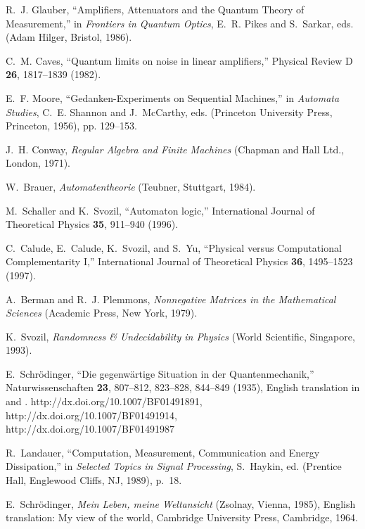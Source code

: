 \documentclass[pra,amsfonts,twocolumn]{revtex4}
\begin{document}
\begin{thebibliography}{10}
R.~J. Glauber, \enquote{Amplifiers, Attenuators and the Quantum Theory of
  Measurement,} in {\em Frontiers in Quantum Optics\/}, E.~R. Pikes and
  S.~Sarkar, eds.  (Adam Hilger, Bristol, 1986).

C.~M. Caves, \enquote{Quantum limits on noise in linear amplifiers,} Physical
  Review D {\bf 26}, 1817--1839 (1982).

E.~F. Moore, \enquote{Gedanken-Experiments on Sequential Machines,} in {\em
  Automata Studies\/}, C.~E. Shannon and J.~McCarthy, eds.  (Princeton
  University Press, Princeton, 1956), pp. 129--153.

J.~H. Conway, {\em Regular Algebra and Finite Machines\/} (Chapman and Hall
  Ltd., London, 1971).

W.~Brauer, {\em Automatentheorie\/} (Teubner, Stuttgart, 1984).

M.~Schaller and K.~Svozil, \enquote{Automaton logic,} International Journal of
  Theoretical Physics {\bf 35}, 911--940 (1996).

C.~Calude, E.~Calude, K.~Svozil, and S.~Yu, \enquote{Physical versus
  Computational Complementarity {I},} International Journal of Theoretical
  Physics {\bf 36}, 1495--1523 (1997).

A.~Berman and R.~J. Plemmons, {\em Nonnegative Matrices in the Mathematical
  Sciences\/} (Academic Press, New York, 1979).

K.~Svozil, {\em Randomness \& Undecidability in Physics\/} (World Scientific,
  Singapore, 1993).

E.~Schr{\"{o}}dinger, \enquote{Die gegenw{\"{a}}rtige {S}ituation in der
  {Q}uantenmechanik,} Naturwissenschaften {\bf 23}, 807--812, 823--828,
  844--849 (1935), {E}nglish translation in \cite{trimmer} and \cite[pp.
  152-167]{wheeler-Zurek:83}.
\newline http://dx.doi.org/10.1007/BF01491891,
  \\http://dx.doi.org/10.1007/BF01491914,
  \\http://dx.doi.org/10.1007/BF01491987

R.~Landauer, \enquote{Computation, Measurement, Communication and Energy
  Dissipation,} in {\em Selected Topics in Signal Processing\/}, S.~Haykin, ed.
   (Prentice Hall, Englewood Cliffs, NJ, 1989), p.~18.

E.~Schr{\"{o}}dinger, {\em Mein Leben, meine Weltansicht\/} (Zsolnay, Vienna,
  1985), {E}nglish translation: My view of the world, Cambridge University
  Press, Cambridge, 1964.


\end{thebibliography}
\end{document}
